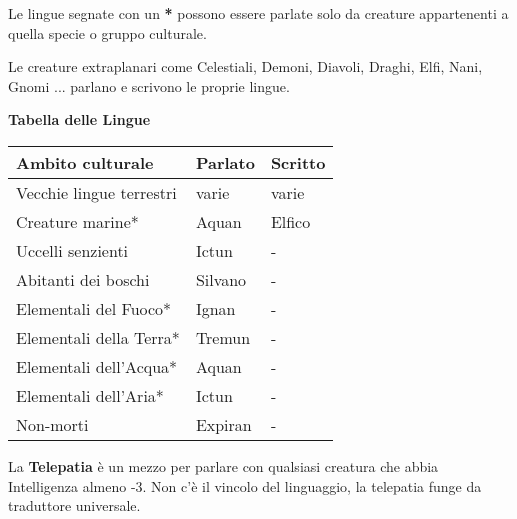 \begin{multicols}{2}
Le lingue segnate con un \textbf{*} possono essere parlate solo da creature appartenenti a quella specie o gruppo culturale.

Le creature extraplanari come Celestiali, Demoni, Diavoli, Draghi, Elfi, Nani, Gnomi ... parlano e scrivono le proprie lingue.

\smallskip

\textbf{Tabella delle Lingue}

\smallskip


{\noindent\begin{tabularx}{0.48\textwidth}{lll}
\textbf{Ambito culturale}& \textbf{Parlato} & \textbf{Scritto}\\
\toprule
Vecchie lingue terrestri& varie & varie\\
Creature marine* & Aquan& Elfico\\
Uccelli senzienti& Ictun & -\\
Abitanti dei boschi& Silvano& - \\
Elementali del Fuoco* & Ignan&-\\
Elementali della Terra*& Tremun &-\\
Elementali dell'Acqua* & Aquan & - \\
Elementali dell'Aria*& Ictun &-\\
Non-morti & Expiran & - \\
\end{tabularx}}


\medskip

La \textbf{Telepatia} è un mezzo per parlare con qualsiasi creatura che abbia Intelligenza almeno -3. Non c'è il vincolo del linguaggio, la telepatia funge da traduttore universale.



\end{multicols}
